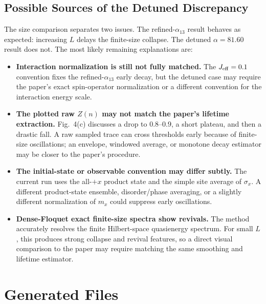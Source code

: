 \documentclass[11pt,a4paper]{article}
\begin{document}
\subsection*{Possible Sources of the Detuned Discrepancy}

The size comparison separates two issues. The refined-\(\alpha_{13}\) result behaves as expected: increasing \(L\) delays the finite-size collapse. The detuned \(\alpha=81.60\) result does not. The most likely remaining explanations are:
\begin{itemize}
  \item \textbf{Interaction normalization is still not fully matched.} The \(J_{\rm eff}=0.1\) convention fixes the refined-\(\alpha_{13}\) early decay, but the detuned case may require the paper's exact spin-operator normalization or a different convention for the interaction energy scale.
  \item \textbf{The plotted raw \(Z(n)\) may not match the paper's lifetime extraction.} Fig.~4(c) discusses a drop to \(0.8\)--\(0.9\), a short plateau, and then a drastic fall. A raw sampled trace can cross thresholds early because of finite-size oscillations; an envelope, windowed average, or monotone decay estimator may be closer to the paper's procedure.
  \item \textbf{The initial-state or observable convention may differ subtly.} The current run uses the all-\(+x\) product state and the simple site average of \(\sigma_x\). A different product-state ensemble, disorder/phase averaging, or a slightly different normalization of \(m_x\) could suppress early oscillations.
  \item \textbf{Dense-Floquet exact finite-size spectra show revivals.} The method accurately resolves the finite Hilbert-space quasienergy spectrum. For small \(L\), this produces strong collapse and revival features, so a direct visual comparison to the paper may require matching the same smoothing and lifetime estimator.
\end{itemize}

\section{Generated Files}
\end{document}

